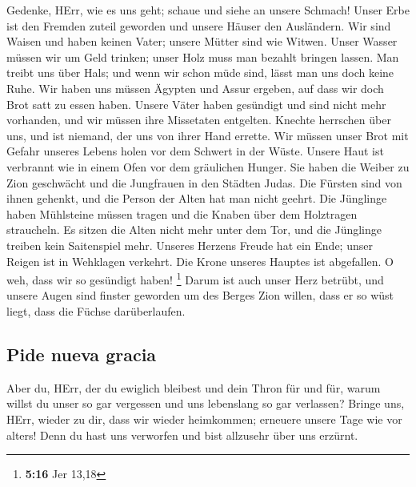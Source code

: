 Gedenke, HErr, wie es uns geht; schaue und siehe an
unsere Schmach!  Unser Erbe ist den Fremden zuteil
geworden und unsere Häuser den Ausländern.  Wir sind
Waisen und haben keinen Vater; unsere Mütter sind wie Witwen.
 Unser Wasser müssen wir um Geld trinken; unser Holz muss
man bezahlt bringen lassen.  Man treibt uns über Hals; und
wenn wir schon müde sind, lässt man uns doch keine Ruhe. 
Wir haben uns müssen Ägypten und Assur ergeben, auf dass wir doch Brot
satt zu essen haben.  Unsere Väter haben gesündigt und
sind nicht mehr vorhanden, und wir müssen ihre Missetaten entgelten.
 Knechte herrschen über uns, und ist niemand, der uns von
ihrer Hand errette.  Wir müssen unser Brot mit Gefahr
unseres Lebens holen vor dem Schwert in der Wüste. 
Unsere Haut ist verbrannt wie in einem Ofen vor dem gräulichen Hunger.
 Sie haben die Weiber zu Zion geschwächt und die
Jungfrauen in den Städten Judas.  Die Fürsten sind von
ihnen gehenkt, und die Person der Alten hat man nicht geehrt.
 Die Jünglinge haben Mühlsteine müssen tragen und die
Knaben über dem Holztragen straucheln.  Es sitzen die
Alten nicht mehr unter dem Tor, und die Jünglinge treiben kein
Saitenspiel mehr.  Unseres Herzens Freude hat ein Ende;
unser Reigen ist in Wehklagen verkehrt.  Die Krone
unseres Hauptes ist abgefallen. O weh, dass wir so gesündigt haben!
\footnote{\textbf{5:16} Jer 13,18}  Darum ist auch unser
Herz betrübt, und unsere Augen sind finster geworden  um
des Berges Zion willen, dass er so wüst liegt, dass die Füchse
darüberlaufen.

\hypertarget{pide-nueva-gracia}{%
\subsection{Pide nueva gracia}\label{pide-nueva-gracia}}

 Aber du, HErr, der du ewiglich bleibest und dein Thron
für und für,  warum willst du unser so gar vergessen und
uns lebenslang so gar verlassen?  Bringe uns, HErr,
wieder zu dir, dass wir wieder heimkommen; erneuere unsere Tage wie vor
alters!  Denn du hast uns verworfen und bist allzusehr
über uns erzürnt.
